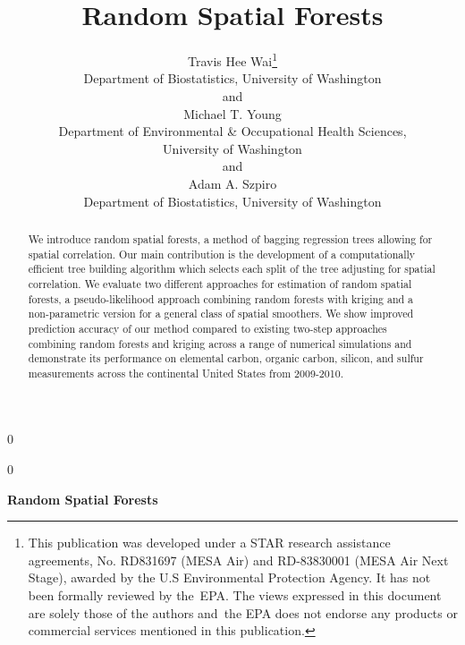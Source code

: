 \documentclass[12pt]{article}
\newcommand{\blind}{0}
\begin{document}
\def\spacingset#1{\renewcommand{\baselinestretch}%
{#1}\small\normalsize} \spacingset{1}



\blind
{
  \title{\bf Random Spatial Forests}
  \author{Travis Hee Wai\thanks{This publication was developed under a STAR research assistance agreements, No. RD831697 (MESA Air) and RD-83830001 (MESA Air Next Stage), awarded by the U.S Environmental Protection Agency. It has not been formally reviewed by the EPA. The views expressed in this document are solely those of the authors and the EPA does not endorse any products or commercial services mentioned in this publication.}  \\
    Department of Biostatistics, University of Washington\\ and\\
    	Michael T. Young\\
    Department of Environmental \& Occupational Health Sciences, \\University of Washington\\  and\\
	Adam A. Szpiro\\ 
	Department of Biostatistics, University of Washington
}
  \maketitle 
} \fi
{}\blind
{
  \bigskip
  \bigskip
  \begin{center}
    {\LARGE\bf Random Spatial Forests}
\end{center}
	\medskip
} \fi

\begin{abstract}
We introduce random spatial forests, a method of bagging regression trees allowing for spatial correlation. Our main contribution is the development of a computationally efficient tree building algorithm which selects each split of the tree adjusting for spatial correlation. We evaluate two different approaches for estimation of random spatial forests, a pseudo-likelihood approach combining random forests with kriging and a non-parametric version for a general class of spatial smoothers. We show improved prediction accuracy of our method compared to existing two-step approaches combining random forests and kriging across a range of numerical simulations and demonstrate its performance on elemental carbon, organic carbon, silicon, and sulfur measurements across the continental United States from 2009-2010.
\end{abstract}
\end{document}

